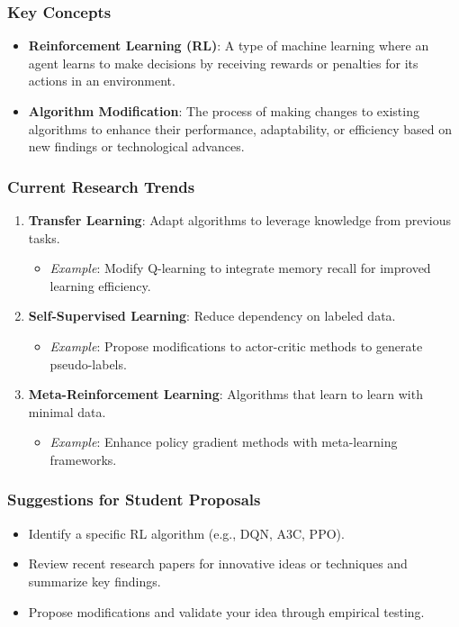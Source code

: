 \documentclass{beamer}
\begin{document}
\begin{frame}
    \frametitle{Key Concepts}
    \begin{itemize}
        \item \textbf{Reinforcement Learning (RL)}: A type of machine learning where an agent learns to make decisions by receiving rewards or penalties for its actions in an environment.
        \item \textbf{Algorithm Modification}: The process of making changes to existing algorithms to enhance their performance, adaptability, or efficiency based on new findings or technological advances.
    \end{itemize}
\end{frame}

\begin{frame}
    \frametitle{Current Research Trends}
    \begin{enumerate}
        \item \textbf{Transfer Learning}: Adapt algorithms to leverage knowledge from previous tasks.
            \begin{itemize}
                \item \textit{Example}: Modify Q-learning to integrate memory recall for improved learning efficiency.
            \end{itemize}
        \item \textbf{Self-Supervised Learning}: Reduce dependency on labeled data.
            \begin{itemize}
                \item \textit{Example}: Propose modifications to actor-critic methods to generate pseudo-labels.
            \end{itemize}
        \item \textbf{Meta-Reinforcement Learning}: Algorithms that learn to learn with minimal data.
            \begin{itemize}
                \item \textit{Example}: Enhance policy gradient methods with meta-learning frameworks.
            \end{itemize}
    \end{enumerate}
\end{frame}

\begin{frame}[fragile]
    \frametitle{Suggestions for Student Proposals}
    \begin{itemize}
        \item Identify a specific RL algorithm (e.g., DQN, A3C, PPO).
        \item Review recent research papers for innovative ideas or techniques and summarize key findings.
        \item Propose modifications and validate your idea through empirical testing.
    \end{itemize}
\end{frame}
\end{document}
